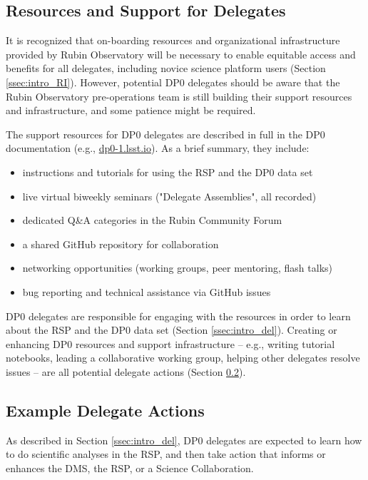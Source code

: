 \documentclass[DM,lsstdraft,authoryear,toc]{lsstdoc}
\begin{document}
\subsection{Resources and Support for Delegates}\label{ssec:res_sup}

It is recognized that on-boarding resources and organizational infrastructure provided by Rubin Observatory will be necessary to enable equitable access and benefits for all delegates, including novice science platform users (Section \ref{ssec:intro_RI}). 
However, potential DP0 delegates should be aware that the Rubin Observatory pre-operations team is still building their support resources and infrastructure, and some patience might be required. 

The support resources for DP0 delegates are described in full in the DP0 documentation (e.g., \url{dp0-1.lsst.io}). As a brief summary, they include:
\begin{itemize}
\item instructions and tutorials for using the RSP and the DP0 data set
\item live virtual biweekly seminars ("Delegate Assemblies", all recorded)
\item dedicated Q\&A categories in the Rubin Community Forum
\item a shared GitHub repository for collaboration
\item networking opportunities (working groups, peer mentoring, flash talks)
\item bug reporting and technical assistance via GitHub issues
\end{itemize}

DP0 delegates are responsible for engaging with the resources in order to learn about the RSP and the DP0 data set (Section \ref{ssec:intro_del}).
Creating or enhancing DP0 resources and support infrastructure -- e.g., writing tutorial notebooks, leading a collaborative working group, helping other delegates resolve issues -- are all potential delegate actions (Section \ref{ssec:res_act}).


\subsection{Example Delegate Actions}\label{ssec:res_act}

As described in Section \ref{ssec:intro_del}, DP0 delegates are expected to learn how to do scientific analyses in the RSP, and then take action that informs or enhances the DMS, the RSP, or a Science Collaboration. 
\end{document}
